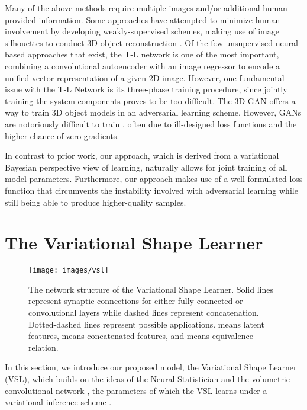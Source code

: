 \documentclass[10pt,twocolumn,letterpaper]{article}
\begin{document}
Many of the above methods require multiple images and/or additional human-provided information. Some approaches have attempted to minimize human involvement by developing weakly-supervised schemes, making use of image silhouettes to conduct 3D object reconstruction \cite{yan2016perspective,Wiles2017SilNetS}. Of the few unsupervised neural-based approaches that exist, the T-L network \cite{girdhar2016learning} is one of the most important, combining a convolutional autoencoder with an image regressor to encode a unified vector representation of a given 2D image. However, one fundamental issue with the T-L Network is its three-phase training procedure, since jointly training the system components proves to be too difficult. The 3D-GAN \cite{wu2016learning} offers a way to train 3D object models in an adversarial learning scheme. However, GANs are notoriously difficult to train \cite{arjovsky2017towards}, often due to ill-designed loss functions and the higher chance of zero gradients.

In contrast to prior work, our approach, which is derived from a variational Bayesian perspective view of learning, naturally allows for joint training of all model parameters. Furthermore, our approach makes use of a well-formulated loss function that circumvents the instability involved with adversarial learning while still being able to produce higher-quality samples.

\section{The Variational Shape Learner}
\label{sec:arch}
\begin{figure*}[ht!]
  \centering
  \texttt{[image: images/vsl]}
  \caption{The network structure of the Variational Shape Learner. Solid lines represent synaptic connections for either fully-connected or convolutional layers while dashed lines represent concatenation. Dotted-dashed lines represent possible applications.  means latent features,  means concatenated features, and  means equivalence relation.}
  \label{fig:vsl}
\end{figure*}

In this section, we introduce our proposed model, the Variational Shape Learner (VSL), which builds on the ideas of the Neural Statistician  \cite{edwards2016towards} and the volumetric convolutional network \cite{maturana2015voxnet}, the parameters of which the VSL learns under a variational inference scheme \cite{kingma2013auto}.
\end{document}
